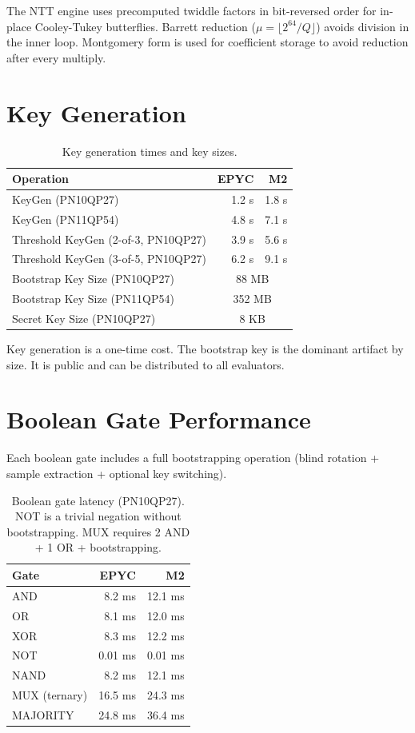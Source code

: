 \documentclass[11pt]{article}
\begin{document}
The NTT engine uses precomputed twiddle factors in bit-reversed order for in-place Cooley-Tukey butterflies. Barrett reduction ($\mu = \lfloor 2^{64}/Q \rfloor$) avoids division in the inner loop. Montgomery form is used for coefficient storage to avoid reduction after every multiply.

\section{Key Generation}

\begin{table}[h]
\centering
\begin{tabular}{@{}lrr@{}}
\toprule
\textbf{Operation} & \textbf{EPYC} & \textbf{M2} \\
\midrule
KeyGen (PN10QP27) & 1.2 s & 1.8 s \\
KeyGen (PN11QP54) & 4.8 s & 7.1 s \\
Threshold KeyGen (2-of-3, PN10QP27) & 3.9 s & 5.6 s \\
Threshold KeyGen (3-of-5, PN10QP27) & 6.2 s & 9.1 s \\
\midrule
Bootstrap Key Size (PN10QP27) & \multicolumn{2}{c}{88 MB} \\
Bootstrap Key Size (PN11QP54) & \multicolumn{2}{c}{352 MB} \\
Secret Key Size (PN10QP27) & \multicolumn{2}{c}{8 KB} \\
\bottomrule
\end{tabular}
\caption{Key generation times and key sizes.}
\label{tab:keygen}
\end{table}

Key generation is a one-time cost. The bootstrap key is the dominant artifact by size. It is public and can be distributed to all evaluators.

\section{Boolean Gate Performance}

Each boolean gate includes a full bootstrapping operation (blind rotation + sample extraction + optional key switching).

\begin{table}[h]
\centering
\begin{tabular}{@{}lrr@{}}
\toprule
\textbf{Gate} & \textbf{EPYC} & \textbf{M2} \\
\midrule
AND & 8.2 ms & 12.1 ms \\
OR & 8.1 ms & 12.0 ms \\
XOR & 8.3 ms & 12.2 ms \\
NOT & 0.01 ms & 0.01 ms \\
NAND & 8.2 ms & 12.1 ms \\
MUX (ternary) & 16.5 ms & 24.3 ms \\
MAJORITY & 24.8 ms & 36.4 ms \\
\bottomrule
\end{tabular}
\caption{Boolean gate latency (PN10QP27). NOT is a trivial negation without bootstrapping. MUX requires 2 AND + 1 OR + bootstrapping.}
\label{tab:gates}
\end{table}
\end{document}
